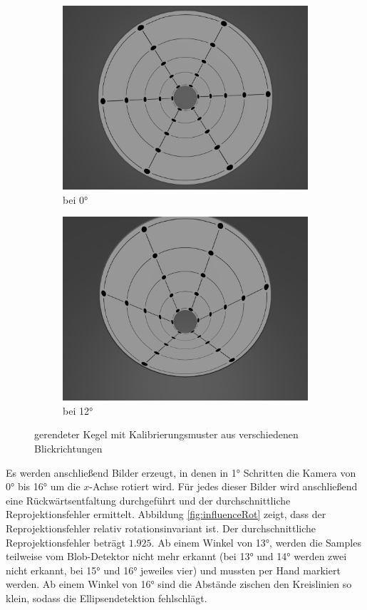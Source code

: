 \begin{figure}[!htb]
	\centering
	\begin{subfigure}{.5\textwidth}
		\centering
		\includegraphics[width=.9\textwidth]{images/blender0.png}
		\caption{bei 0°}
	\end{subfigure}%
	\begin{subfigure}{.5\textwidth}
		\centering
		\includegraphics[width=.9\textwidth]{images/blender12.png}
		\caption{bei 12°}
	\end{subfigure}
	\caption{gerendeter Kegel mit Kalibrierungsmuster aus verschiedenen Blickrichtungen}
	\label{fig:blender}
\end{figure}


Es werden anschließend Bilder erzeugt, in denen in 1° Schritten die Kamera von 0° bis 16° um die $x$-Achse rotiert wird. Für jedes dieser Bilder wird anschließend eine Rückwärtsentfaltung durchgeführt und der durchschnittliche Reprojektionsfehler ermittelt. Abbildung \ref{fig:influenceRot} zeigt, dass der Reprojektionsfehler relativ rotationsinvariant ist. Der durchschnittliche Reprojektionsfehler beträgt $1.925$. Ab einem Winkel von  13°, werden die Samples teilweise vom Blob-Detektor nicht mehr erkannt (bei 13° und 14° werden zwei nicht erkannt, bei 15° und 16° jeweiles vier) und mussten per Hand markiert werden. Ab einem Winkel von 16° sind die Abstände zischen den Kreislinien so klein, sodass die Ellipsendetektion fehlschlägt.


